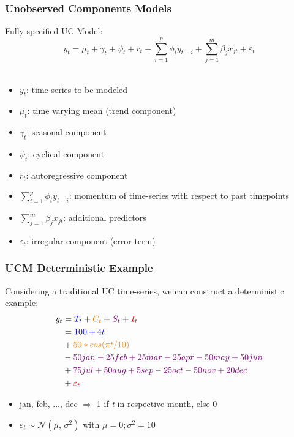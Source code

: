 \documentclass{beamer}
\begin{document}
\begin{frame}[t]\frametitle{Unobserved Components Models}
Fully specified UC Model:
\bigskip
\[y_{t} = \mu_{t}+\gamma_{t}+\psi_{t}+r_{t}+\sum_{i=1}^p\phi_{i}y_{t-i} + \sum_{j=1}^m\beta_{j}x_{jt}+\varepsilon_{t}  \] \\
\bigskip
\begin{itemize}
\item $y_{t}$: time-series to be modeled\\ 
\item $\mu_{t}$: time varying mean (trend component)\\
\item $\gamma_{t}$: seasonal component\\
\item $\psi_{t}$: cyclical component\\
\item $r_{t}$: autoregressive component\\
\item $\sum_{i=1}^p\phi_{i}y_{t-i}$: momentum of time-series with respect to past timepoints\\
\item $\sum_{j=1}^m\beta_{j}x_{jt}$: additional predictors\\
\item $\varepsilon_{t}$: irregular component (error term)
\end{itemize}
\end{frame}


\begin{frame}[t]\frametitle{UCM Deterministic Example}
Considering a traditional UC time-series, we can construct a deterministic example:
\bigskip
\begin{align*}
y_{t} &= \color{blue}T_{t}
	   \color{black}+ \color{orange} C_{t}
	   \color{black}+ \color{violet} S_{t}
	   \color{black}+ \color{red} I_{t} \\
	  &= \color{blue} 100+4t \\
	  &+ \color{orange} 50*cos(\pi t/10) \\
	  &- \color{violet} 50jan-25feb+25mar-25apr-50may+50jun \\
	  &+ \color{violet} 75jul+50aug+5sep-25oct-50nov+20dec \\
	  &+ \color{red} \varepsilon_{t}
\end{align*}
\begin{itemize}
\item jan, feb, ..., dec $\Rightarrow$ 1 if \textit{t} in respective month, else 0
\item $\varepsilon_{t} \sim \mathcal{N}(\mu,\,\sigma^{2})$ with $\mu = 0; \sigma^{2} = 10$

\end{itemize}
\end{frame}
\end{document}
